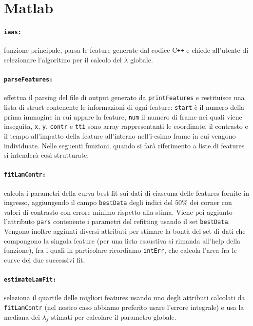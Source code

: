 \documentclass[12pt]{report}
\begin{document}
\section{Matlab}

\paragraph*{\verb_iaas:_} funzione principale, parsa le feature generate dal codice C\verb|++| e chiede all'utente di selezionare l'algoritmo per il calcolo del $\lambda$ globale.

\paragraph*{\verb_parseFeatures:_} effettua il parsing del file di output generato da \verb|printFeatures| e restituisce una lista di struct contenente le informazioni di ogni feature: \verb|start| \`e il numero della prima immagine in cui appare la feature, \verb|num| il numero di frame nei quali viene inseguita, \verb|x|, \verb|y|, \verb|contr| e \verb|tti| sono array rappresentanti le coordinate, il contrasto e il tempo all'impatto della feature all'interno nell'i-esimo frame in cui vengono individuate. Nelle seguenti funzioni, quando si far\`a riferimento a liste di features si intender\`a cos\`i strutturate.

\paragraph*{\verb_fitLamContr:_} calcola i parametri della curva best fit sui dati di ciascuna delle features fornite in ingresso, aggiungendo il campo \verb|bestData| degli indici del $50\%$ dei corner con valori di contrasto con errore minimo rispetto alla stima. Viene poi aggiunto l'attributo \verb|pars| contenente i parametri del refitting usando il set \verb|bestData|. Vengono inoltre aggiunti diversi attributi per stimare la bont\`a del set di dati che compongono la singola feature (per una lista esaustiva si rimanda all'help della funzione), fra i quali in particolare ricordiamo \verb|intErr|, che calcola l'area fra le curve dei due successivi fit.

\paragraph*{\verb_estimateLamFit:_} seleziona il quartile delle migliori features usando uno degli attributi calcolati da \verb|fitLamContr| (nel nostro caso abbiamo preferito usare l'errore integrale) e usa la mediana dei $\lambda_f$ stimati per calcolare il parametro globale.
\end{document}
